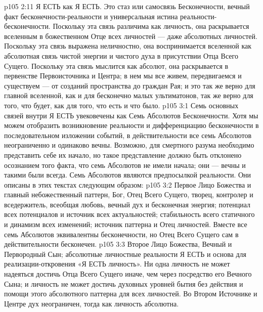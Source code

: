 \vs p105 2:11 \bibnobreakspace {} Я ЕСТЬ как Я ЕСТЬ. Это стаз или самосвязь Бесконечности, вечный факт бесконечности\hyp{}реальности и универсальная истина реальности\hyp{}бесконечности. Поскольку эта связь различима как личность, она раскрывается вселенным в божественном Отце всех личностей --- даже абсолютных личностей. Поскольку эта связь выражена неличностно, она воспринимается вселенной как абсолютная связь чистой энергии и чистого духа в присутствии Отца Всего Сущего. Поскольку эта связь мыслится как абсолют, она раскрывается в первенстве Первоисточника и Центра; в нем мы все живем, передвигаемся и существуем --- от созданий пространства до граждан Рая; и это так же верно для главной вселенной, как и для бесконечно малых ультиматонов, так же верно для того, что будет, как для того, что есть и что было.
\vs p105 3:1 Семь основных связей внутри Я ЕСТЬ увековечены как Семь Абсолютов Бесконечности. Хотя мы можем отобразить возникновение реальности и дифференциацию бесконечности в последовательном изложении событий, в действительности все семь Абсолютов неограниченно и одинаково вечны. Возможно, для смертного разума необходимо представить себе их начало, но такое представление должно быть отклонено осознанием того факта, что семь Абсолютов не имели начала; они --- вечны и такими были всегда. Семь Абсолютов являются предпосылкой реальности. Они описаны в этих текстах следующим образом:
\vs p105 3:2 \bibnobreakspace {} Первое Лицо Божества и главный небожественный паттерн, Бог, Отец Всего Сущего, творец, контролер и вседержитель, всеобщая любовь, вечный дух и бесконечная энергия; потенциал всех потенциалов и источник всех актуальностей; стабильность всего статичного и динамизм всех изменений; источник паттерна и Отец личностей. Вместе все семь Абсолютов эквивалентны бесконечности, но Отец Всего Сущего сам в действительности бесконечен.
\vs p105 3:3 \bibnobreakspace {} Второе Лицо Божества, Вечный и Первородный Сын; абсолютные личностные реальности Я ЕСТЬ и основа для реализации\hyp{}откровения «Я ЕСТЬ личность». Ни одна личность не может надеяться достичь Отца Всего Сущего иначе, чем через посредство его Вечного Сына; и личность не может достичь духовных уровней бытия без действия и помощи этого абсолютного паттерна для всех личностей. Во Втором Источнике и Центре дух неограничен, тогда как личность абсолютна.
